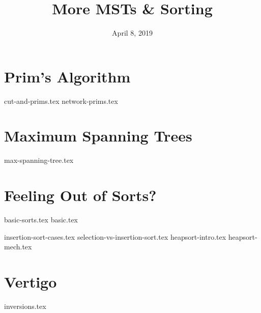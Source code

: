\documentclass[11pt]{exam}
\title{More MSTs \& Sorting}
\date{April 8, 2019}
\begin{document}
\maketitle

\section{Prim's Algorithm}
\begin{questions}
{cut-and-prims.tex}
{network-prims.tex}
\end{questions}

\clearpage

\section{Maximum Spanning Trees}
\begin{questions}
{max-spanning-tree.tex}
\end{questions}

\clearpage

\section{Feeling Out of Sorts?}

{basic-sorts.tex}
{basic.tex}
\begin{questions}
{insertion-sort-cases.tex}
{selection-vs-insertion-sort.tex}
{heapsort-intro.tex}
{heapsort-mech.tex}

\end{questions}
\clearpage

\section{Vertigo}
\begin{questions}
{inversions.tex}
\end{questions}
\end{document}
